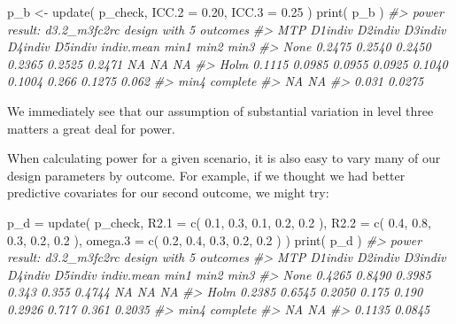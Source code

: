 \documentclass[
]{article}
\newenvironment{Shaded}{\begin{snugshade}}{\end{snugshade}}
\newcommand{\AttributeTok}[1]{\textcolor[rgb]{0.77,0.63,0.00}{#1}}
\newcommand{\CommentTok}[1]{\textcolor[rgb]{0.56,0.35,0.01}{\textit{#1}}}
\newcommand{\FloatTok}[1]{\textcolor[rgb]{0.00,0.00,0.81}{#1}}
\newcommand{\FunctionTok}[1]{\textcolor[rgb]{0.00,0.00,0.00}{#1}}
\newcommand{\NormalTok}[1]{#1}
\newcommand{\OtherTok}[1]{\textcolor[rgb]{0.56,0.35,0.01}{#1}}
\begin{document}
\begin{Shaded}
\begin{Highlighting}[]
\NormalTok{p\_b }\OtherTok{\textless{}{-}} \FunctionTok{update}\NormalTok{( p\_check, }\AttributeTok{ICC.2 =} \FloatTok{0.20}\NormalTok{, }\AttributeTok{ICC.3 =} \FloatTok{0.25}\NormalTok{ )}
\FunctionTok{print}\NormalTok{( p\_b )}
\CommentTok{\#\textgreater{} power result: d3.2\_m3fc2rc design with 5 outcomes}
\CommentTok{\#\textgreater{}   MTP D1indiv D2indiv D3indiv D4indiv D5indiv indiv.mean  min1   min2  min3}
\CommentTok{\#\textgreater{}  None  0.2475  0.2540  0.2450  0.2365  0.2525     0.2471    NA     NA    NA}
\CommentTok{\#\textgreater{}  Holm  0.1115  0.0985  0.0955  0.0925  0.1040     0.1004 0.266 0.1275 0.062}
\CommentTok{\#\textgreater{}   min4 complete}
\CommentTok{\#\textgreater{}     NA       NA}
\CommentTok{\#\textgreater{}  0.031   0.0275}
\end{Highlighting}
\end{Shaded}

We immediately see that our assumption of substantial variation in level
three matters a great deal for power.

When calculating power for a given scenario, it is also easy to vary
many of our design parameters by outcome. For example, if we thought we
had better predictive covariates for our second outcome, we might try:

\begin{Shaded}
\begin{Highlighting}[]
\NormalTok{p\_d }\OtherTok{=} \FunctionTok{update}\NormalTok{( p\_check,}
            \AttributeTok{R2.1 =} \FunctionTok{c}\NormalTok{( }\FloatTok{0.1}\NormalTok{, }\FloatTok{0.3}\NormalTok{, }\FloatTok{0.1}\NormalTok{, }\FloatTok{0.2}\NormalTok{, }\FloatTok{0.2}\NormalTok{ ),}
            \AttributeTok{R2.2 =} \FunctionTok{c}\NormalTok{( }\FloatTok{0.4}\NormalTok{, }\FloatTok{0.8}\NormalTok{, }\FloatTok{0.3}\NormalTok{, }\FloatTok{0.2}\NormalTok{, }\FloatTok{0.2}\NormalTok{ ),}
            \AttributeTok{omega.3 =} \FunctionTok{c}\NormalTok{( }\FloatTok{0.2}\NormalTok{, }\FloatTok{0.4}\NormalTok{, }\FloatTok{0.3}\NormalTok{, }\FloatTok{0.2}\NormalTok{, }\FloatTok{0.2}\NormalTok{ ) )}
\FunctionTok{print}\NormalTok{( p\_d )}
\CommentTok{\#\textgreater{} power result: d3.2\_m3fc2rc design with 5 outcomes}
\CommentTok{\#\textgreater{}   MTP D1indiv D2indiv D3indiv D4indiv D5indiv indiv.mean  min1  min2   min3}
\CommentTok{\#\textgreater{}  None  0.4265  0.8490  0.3985   0.343   0.355     0.4744    NA    NA     NA}
\CommentTok{\#\textgreater{}  Holm  0.2385  0.6545  0.2050   0.175   0.190     0.2926 0.717 0.361 0.2035}
\CommentTok{\#\textgreater{}    min4 complete}
\CommentTok{\#\textgreater{}      NA       NA}
\CommentTok{\#\textgreater{}  0.1135   0.0845}
\end{Highlighting}
\end{Shaded}
\end{document}
